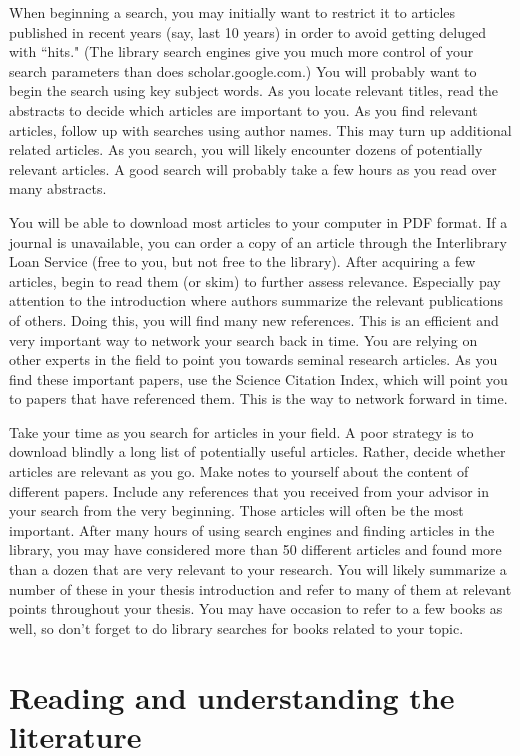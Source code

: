 When beginning a search, you may initially want to restrict it to
articles published in recent years (say, last 10 years) in order to
avoid getting deluged with ``hits." (The library search engines
give you much more control of your search parameters than does
scholar.google.com.) You will probably want to begin
the search using key subject words. As you locate relevant titles,
read the abstracts to decide which articles are important to you. As
you find relevant articles, follow up with searches using author
names. This may turn up additional related articles.  As you search,
you will likely encounter dozens of potentially relevant articles. A good
search will probably take a few hours as you read over many abstracts.

You will be able to download most articles to your computer in PDF format.
If a journal is unavailable, you can order a copy of an article
through the Interlibrary Loan Service (free to you, but not free to
the library).  After acquiring a few articles,
begin to read them (or skim) to further assess relevance. Especially
pay attention to the introduction where authors summarize the
relevant publications of others. Doing this, you will find many new
references. This is an efficient and very important way to network
your search back in time. You are relying on other experts in the
field to point you towards seminal research articles. As you find
these important papers, use the Science Citation Index, which will
point you to papers that have referenced them. This is the way to
network forward in time.

Take your time as you search for articles in your field. A poor
strategy is to download blindly a long list of potentially useful
articles. Rather, decide whether articles are relevant as you go.
Make notes to yourself about the content of different papers.
Include any references that you received from your advisor in your
search from the very beginning. Those articles will often be the
most important. After many hours of using search engines and finding
articles in the library, you may have considered more than 50
different articles and found more than a dozen that are very
relevant to your research. You will likely summarize a number of
these in your thesis introduction and refer to many of them at
relevant points throughout your thesis. You may have occasion to
refer to a few books as well, so don't forget to do library searches
for books related to your topic.

\section{Reading and understanding the literature}
\label{sec:ReadingLit} 

